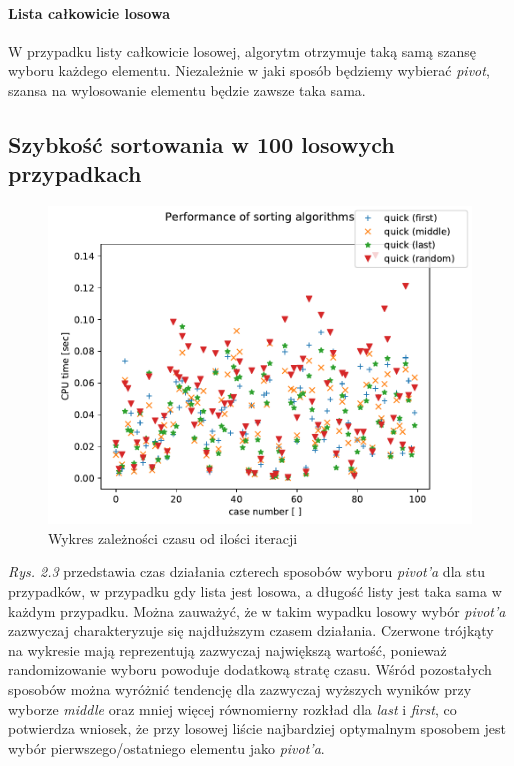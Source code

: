 \documentclass[a4paper,11pt]{report}
\begin{document}
\paragraph{Lista całkowicie losowa}
W przypadku listy całkowicie losowej, algorytm otrzymuje taką samą szansę wyboru każdego elementu. Niezależnie w jaki sposób będziemy wybierać \textit{pivot}, szansa na wylosowanie elementu będzie zawsze taka sama.



\subsection{Szybkość sortowania w 100 losowych przypadkach}
\begin{figure}[h!]
\centering
\includegraphics[scale=1]{Figure_2.pdf}
\caption{Wykres zależności czasu od ilości iteracji}
\end{figure}

\textit{Rys. 2.3} przedstawia czas działania czterech sposobów wyboru \textit{pivot'a} dla stu przypadków, w przypadku gdy lista jest losowa, a długość listy jest taka sama w każdym przypadku. Można zauważyć, że w takim wypadku losowy wybór \textit{pivot'a} zazwyczaj charakteryzuje się najdłuższym czasem działania. Czerwone trójkąty na wykresie mają reprezentują zazwyczaj największą wartość, ponieważ randomizowanie wyboru powoduje dodatkową stratę czasu. Wśród pozostałych sposobów można wyróżnić tendencję dla zazwyczaj wyższych wyników przy wyborze \textit{middle} oraz mniej więcej równomierny rozkład dla \textit{last} i \textit{first}, co potwierdza wniosek, że przy losowej liście najbardziej optymalnym sposobem jest wybór pierwszego/ostatniego elementu jako \textit{pivot'a}.
\end{document}
